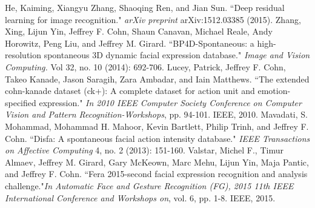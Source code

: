 \documentclass[a4paper, 10pt, conference]{ieeeconf}      %
\begin{document}
\begin{thebibliography}{99}
He, Kaiming, Xiangyu Zhang, Shaoqing Ren, and Jian Sun. ``Deep residual learning for image recognition." {\it arXiv preprint} arXiv:1512.03385 (2015).
Zhang, Xing, Lijun Yin, Jeffrey F. Cohn, Shaun Canavan, Michael Reale, Andy Horowitz, Peng Liu, and Jeffrey M. Girard. ``BP4D-Spontaneous: a high-resolution spontaneous 3D dynamic facial expression database." {\it Image and Vision Computing.} Vol 32, no. 10 (2014): 692-706.
Lucey, Patrick, Jeffrey F. Cohn, Takeo Kanade, Jason Saragih, Zara Ambadar, and Iain Matthews. ``The extended cohn-kanade dataset (ck+): A complete dataset for action unit and emotion-specified expression." {\it In 2010 IEEE Computer Society Conference on Computer Vision and Pattern Recognition-Workshops}, pp. 94-101. IEEE, 2010.
Mavadati, S. Mohammad, Mohammad H. Mahoor, Kevin Bartlett, Philip Trinh, and Jeffrey F. Cohn. ``Disfa: A spontaneous facial action intensity database." {\it IEEE Transactions on Affective Computing} 4, no. 2 (2013): 151-160.
Valstar, Michel F., Timur Almaev, Jeffrey M. Girard, Gary McKeown, Marc Mehu, Lijun Yin, Maja Pantic, and Jeffrey F. Cohn. ``Fera 2015-second facial expression recognition and analysis challenge."{\it In Automatic Face and Gesture Recognition (FG), 2015 11th IEEE International Conference and Workshops on}, vol. 6, pp. 1-8. IEEE, 2015.

\end{thebibliography}
\end{document}
